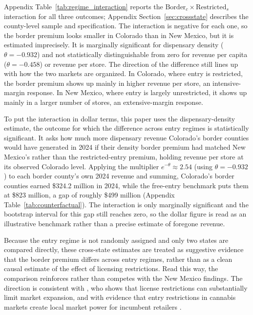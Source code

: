 \documentclass[english,12pt]{article}
\begin{document}
Appendix Table~\ref{tab:regime_interaction} reports the $\text{Border}_c \times \text{Restricted}_s$ interaction for all three outcomes; Appendix Section~\ref{sec:crossstate} describes the county-level sample and specification. The interaction is negative for each one, so the border premium looks smaller in Colorado than in New Mexico, but it is estimated imprecisely. It is marginally significant for dispensary density ($\theta=-0.932$) and not statistically distinguishable from zero for revenue per capita ($\theta=-0.458$) or revenue per store. The direction of the difference still lines up with how the two markets are organized. In Colorado, where entry is restricted, the border premium shows up mainly in higher revenue per store, an intensive-margin response. In New Mexico, where entry is largely unrestricted, it shows up mainly in a larger number of stores, an extensive-margin response.

To put the interaction in dollar terms, this paper uses the dispensary-density estimate, the outcome for which the difference across entry regimes is statistically significant. It asks how much more dispensary revenue Colorado's border counties would have generated in 2024 if their density border premium had matched New Mexico's rather than the restricted-entry premium, holding revenue per store at its observed Colorado level. Applying the multiplier $e^{-\theta}\approx2.54$ (using $\theta=-0.932$) to each border county's own 2024 revenue and summing, Colorado's border counties earned \$324.2 million in 2024, while the free-entry benchmark puts them at \$823 million, a gap of roughly \$499 million (Appendix Table~\ref{tab:counterfactual}). The interaction is only marginally significant and the bootstrap interval for this gap still reaches zero, so the dollar figure is read as an illustrative benchmark rather than a precise estimate of foregone revenue.

Because the entry regime is not randomly assigned and only two states are compared directly, these cross-state estimates are treated as suggestive evidence that the border premium differs across entry regimes, rather than as a clean causal estimate of the effect of licensing restrictions. Read this way, the comparison reinforces rather than competes with the New Mexico findings. The direction is consistent with \citet{thomas2019license}, who shows that license restrictions can substantially limit market expansion, and with evidence that entry restrictions in cannabis markets create local market power for incumbent retailers \citep{HollenbeckUetake2021}.
\end{document}
